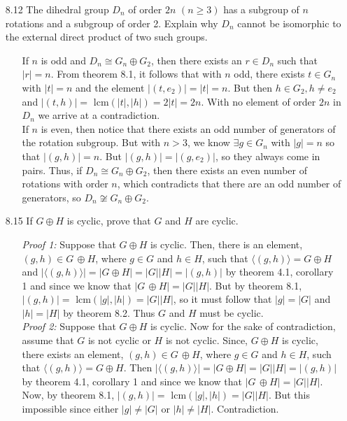 \documentclass[12pt]{article}
\begin{document}
\begin{enumerate}
\item[8.12] The dihedral group $D_n$ of order $2n$ $(n \geq 3)$ has a subgroup of $n$ rotations
and a subgroup of order 2. Explain why $D_n$ cannot be isomorphic to the external direct
product of two such groups.
\begin{enumerate}
\item[] If $n$ is odd and $D_n \cong G_n \oplus G_2$, then there exists an $r \in D_n$ such that
$|r| = n$. From theorem 8.1, it follows that with $n$ odd, there exists $t \in G_n$ with 
$|t| = n$ and the element $|(t, e_2)| = |t| = n$. But then $h \in G_2, h \neq e_2$ and
$|(t, h)| = $ lcm$(|t|, |h|) = 2|t| = 2n$. With no element of order $2n$ in $D_n$ we arrive
at a contradiction. \\
If $n$ is even, then notice that there exists an odd number of generators of the rotation 
subgroup. But with $n > 3$, we know $\exists g \in G_n$ with $|g| = n$ so that $|(g, h)| = n$.
But $|(g, h)| = |(g, e_2)|$, so they always come in pairs. Thus, if $D_n \cong G_n \oplus G_2$, 
then there exists an even number of rotations with order $n$, which contradicts that there
are an odd number of generators, so $D_n \not\cong G_n \oplus G_2$.
\end{enumerate}

\item[8.15] If $G \oplus H$ is cyclic, prove that $G$ and $H$ are cyclic.
\begin{enumerate}
\item[] \emph{Proof 1:} Suppose that $G \oplus H$ is cyclic. Then, there is an element, 
$(g, h) \in G\, \oplus H$, where $g \in G$ and $h \in H$, such that $\langle (g, h)\rangle = G 
\oplus H$ and $|\langle(g, h)\rangle| = |G \oplus H| = |G||H| = |(g, h)|$ by theorem 4.1, corollary 1
and since we know that $|G\, \oplus H| = |G||H|$. But by theorem 8.1, $|(g, h)| = $ lcm$(|g|, |h|) = 
|G||H|$, so it must follow that $|g| = |G|$ and $|h| = |H|$ by theorem 8.2. Thus $G$ and $H$ must be cyclic.
\[ \] 
\emph{Proof 2:} Suppose that $G \oplus H$ is cyclic. Now for the sake of contradiction, assume that 
$G$ is not cyclic or $H$ is not cyclic. Since, $G \oplus H$ is cyclic, there exists an element, 
$(g, h) \in G\, \oplus H$, where $g \in G$ and $h \in H$, such that $\langle (g, h)\rangle = G 
\oplus H$. Then $|\langle(g, h)\rangle| = |G \oplus H| = |G||H| = |(g, h)|$ by theorem 4.1, corollary 1
and since we know that $|G\, \oplus H| = |G||H|$. Now, by theorem 8.1, $|(g, h)| = $ lcm$(|g|, |h|) = 
|G||H|$. But this impossible since either $|g| \neq |G|$ or $|h| \neq |H|$. Contradiction.
\end{enumerate}


\end{enumerate}
\end{document}
